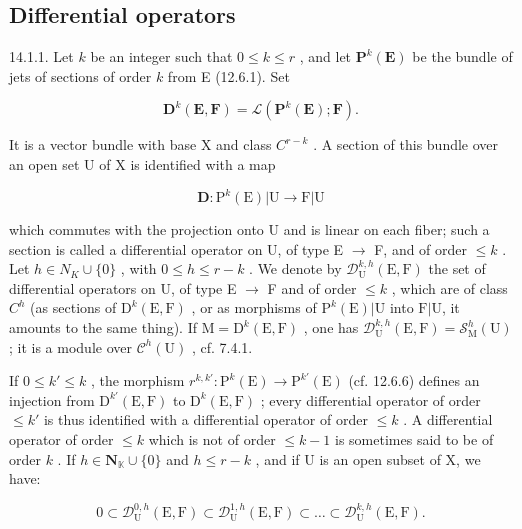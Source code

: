 \subsection{Differential operators}

14.1.1. Let \(k\) be an integer such that \(0 \leqslant k \leqslant r\) , and let \(\mathbf{P}^k(\mathbf{E})\) be the bundle of jets of sections of order \(k\) from E (12.6.1). Set

\[
\mathbf {D} ^ {k} (\mathbf {E}, \mathbf {F}) = \mathscr {L} (\mathbf {P} ^ {k} (\mathbf {E}); \mathbf {F}).
\]

It is a vector bundle with base X and class \(C^{r-k}\) . A section of this bundle over an open set U of X is identified with a map

\[
\mathbf {D}: \mathrm{P} ^ {k} (\mathrm{E}) | \mathrm{U} \rightarrow \mathrm{F} | \mathrm{U}
\]

which commutes with the projection onto U and is linear on each fiber; such a section is called a differential operator on U, of type E \(\to\) F, and of order \(\leqslant k\) . Let \(h \in N_{K} \cup \{0\}\) , with \(0 \leqslant h \leqslant r-k\) . We denote by \(\mathcal{D}_{\mathrm{U}}^{k,h}(\mathrm{E}, \mathrm{F})\) the set of differential operators on U, of type E \(\to\) F and of order \(\leqslant k\) , which are of class \(C^{h}\) (as sections of \(\mathrm{D}^{k}(\mathrm{E}, \mathrm{F})\) , or as morphisms of \(\mathrm{P}^{k}(\mathrm{E})|\mathrm{U}\) into \(\mathrm{F}|\mathrm{U}\), it amounts to the same thing). If \(\mathrm{M} = \mathrm{D}^{k}(\mathrm{E}, \mathrm{F})\) , one has \(\mathcal{D}_{\mathrm{U}}^{k,h}(\mathrm{E}, \mathrm{F}) = \mathcal{S}_{\mathrm{M}}^{h}(\mathrm{U})\) ; it is a module over \(\mathcal{C}^{h}(\mathrm{U})\) , cf. 7.4.1.

If \(0 \leqslant k' \leqslant k\) , the morphism \(r^{k, k'}: \mathrm{P}^{k}(\mathrm{E}) \to \mathrm{P}^{k'}(\mathrm{E})\) (cf. 12.6.6) defines an injection from \(\mathrm{D}^{k'}(\mathrm{E}, \mathrm{F})\) to \(\mathrm{D}^{k}(\mathrm{E}, \mathrm{F})\) ; every differential operator of order \(\leqslant k'\) is thus identified with a differential operator of order \(\leqslant k\) . A differential operator of order \(\leqslant k\) which is not of order \(\leqslant k - 1\) is sometimes said to be of order \(k\) . If \(h \in \mathbf{N}_{\mathbb{K}} \cup \{0\}\) and \(h \leqslant r - k\) , and if U is an open subset of X, we have:

\[
0 \subset \mathcal {D} _ {\mathrm{U}} ^ {0, h} (\mathrm{E}, \mathrm{F}) \subset \mathcal {D} _ {\mathrm{U}} ^ {1, h} (\mathrm{E}, \mathrm{F}) \subset \dots \subset \mathcal {D} _ {\mathrm{U}} ^ {k, h} (\mathrm{E}, \mathrm{F}).
\]

